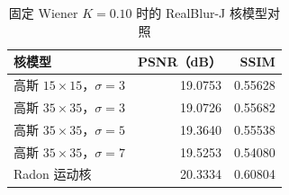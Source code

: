 \begin{table}[htbp]
\centering
\caption{固定 Wiener $K=0.10$ 时的 RealBlur-J 核模型对照}
\label{tab:radon-fixed-k}
\begin{tabular}{lrr}
\toprule
核模型 & PSNR（dB） & SSIM \\
\midrule
高斯 $ 15\times15$，$\sigma=3$ & 19.0753 & 0.55628 \\
高斯 $ 35\times35$，$\sigma=3$ & 19.0726 & 0.55682 \\
高斯 $ 35\times35$，$\sigma=5$ & 19.3640 & 0.55538 \\
高斯 $ 35\times35$，$\sigma=7$ & 19.5253 & 0.54080 \\
Radon 运动核 & 20.3334 & 0.60804 \\
\bottomrule
\end{tabular}
\end{table}
